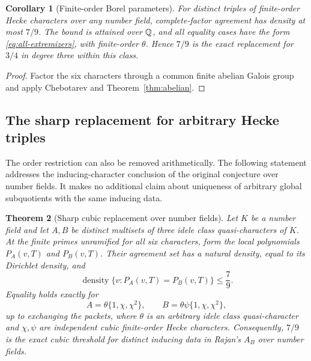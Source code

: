 \documentclass[11pt]{article}
\newtheorem{theorem}{Theorem}[section]
\newtheorem{corollary}[theorem]{Corollary}
\theoremstyle{remark}\newtheorem{remark}[theorem]{Remark}
\begin{document}
\begin{corollary}[Finite-order Borel parameters]\label{cor:finite}
For distinct triples of finite-order Hecke characters over any number field, complete-factor agreement has density at most $7/9$. The bound is attained over $\mathbb Q$, and all equality cases have the form \eqref{eq:all-extremizers}, with finite-order $\theta$. Hence $7/9$ is the exact replacement for $3/4$ in degree three within this class.
\end{corollary}

\begin{proof}
Factor the six characters through a common finite abelian Galois group and apply Chebotarev and Theorem~\ref{thm:abelian}.
\end{proof}

\subsection{The sharp replacement for arbitrary Hecke triples}

The order restriction can also be removed arithmetically. The following statement addresses the inducing-character conclusion of the original conjecture over number fields. It makes no additional claim about uniqueness of arbitrary global subquotients with the same inducing data.

\begin{theorem}[Sharp cubic replacement over number fields]\label{thm:allHecke}
Let $K$ be a number field and let $A,B$ be distinct multisets of three idele class quasi-characters of $K$. At the finite primes unramified for all six characters, form the local polynomials $P_A(v,T)$ and $P_B(v,T)$. Their agreement set has a natural density, equal to its Dirichlet density, and
\[
 \operatorname{density}\{v:P_A(v,T)=P_B(v,T)\}\le\frac79.
\]
Equality holds exactly for
\[
 A=\theta\{1,\chi,\chi^2\},\qquad
 B=\theta\psi\{1,\chi,\chi^2\},
\]
up to exchanging the packets, where $\theta$ is an arbitrary idele class quasi-character and $\chi,\psi$ are independent cubic finite-order Hecke characters. Consequently, $7/9$ is the exact cubic threshold for distinct inducing data in Rajan's $A_B$ over number fields.
\end{theorem}
\end{document}
